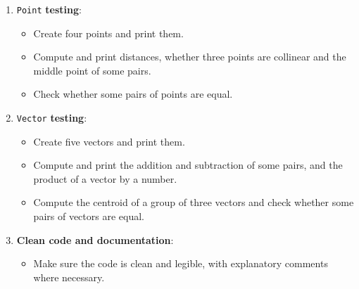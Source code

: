 \begin{enumerate}

    \item \texttt{Point} \textbf{testing}:

        \begin{itemize}

            \item Create four points and print them.

            \item Compute and print distances, whether three points are collinear and the middle point of some pairs.

            \item Check whether some pairs of points are equal.

        \end{itemize}

    \item \texttt{Vector} \textbf{testing}:

        \begin{itemize}

            \item Create five vectors and print them.

            \item Compute and print the addition and subtraction of some pairs, and the product of a vector by a number.

            \item Compute the centroid of a group of three vectors and check whether some pairs of vectors are equal.

        \end{itemize}

    \item \textbf{Clean code and documentation}:

        \begin{itemize}

            \item Make sure the code is clean and legible, with explanatory comments where necessary.

        \end{itemize}

\end{enumerate}
